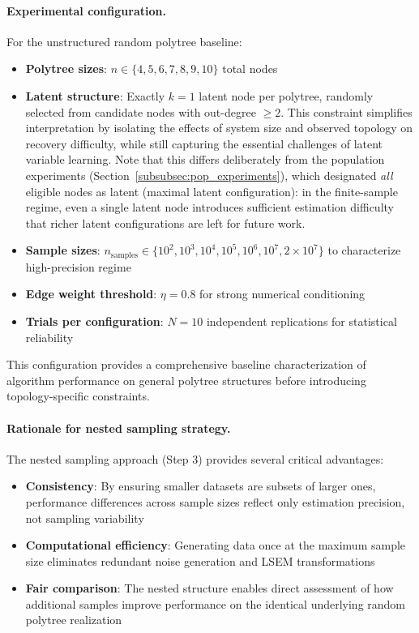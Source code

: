 \documentclass[11pt,a4paper]{article}
\numberwithin{equation}{section}
\begin{document}
\paragraph{Experimental configuration.} For the unstructured random polytree baseline:

\begin{itemize}
\item \textbf{Polytree sizes}: $n \in \{4, 5, 6, 7, 8, 9, 10\}$ total nodes
\item \textbf{Latent structure}: Exactly $k = 1$ latent node per polytree,
randomly selected from candidate nodes with out-degree $\geq 2$.  This
constraint simplifies interpretation by isolating the effects of system size
and observed topology on recovery difficulty, while still capturing the
essential challenges of latent variable learning.  Note that this differs
deliberately from the population experiments (Section~\ref{subsubsec:pop_experiments}),
which designated \emph{all} eligible nodes as latent (maximal latent
configuration): in the finite-sample regime, even a single latent node
introduces sufficient estimation difficulty that richer latent configurations
are left for future work.
\item \textbf{Sample sizes}: $n_{\text{samples}} \in \{10^2, 10^3, 10^4, 10^5, 10^6, 10^7, 2 \times 10^7\}$ to characterize high-precision regime
\item \textbf{Edge weight threshold}: $\eta = 0.8$ for strong numerical conditioning
\item \textbf{Trials per configuration}: $N = 10$ independent replications for statistical reliability
\end{itemize}
This configuration provides a comprehensive baseline characterization of algorithm performance on general polytree structures before introducing topology-specific constraints.

\paragraph{Rationale for nested sampling strategy.} The nested sampling approach (Step 3) provides several critical advantages:

\begin{itemize}
\item \textbf{Consistency}: By ensuring smaller datasets are subsets of larger ones, performance differences across sample sizes reflect only estimation precision, not sampling variability
\item \textbf{Computational efficiency}: Generating data once at the maximum sample size eliminates redundant noise generation and LSEM transformations
\item \textbf{Fair comparison}: The nested structure enables direct assessment of how additional samples improve performance on the identical underlying random polytree realization
\end{itemize}
\end{document}
